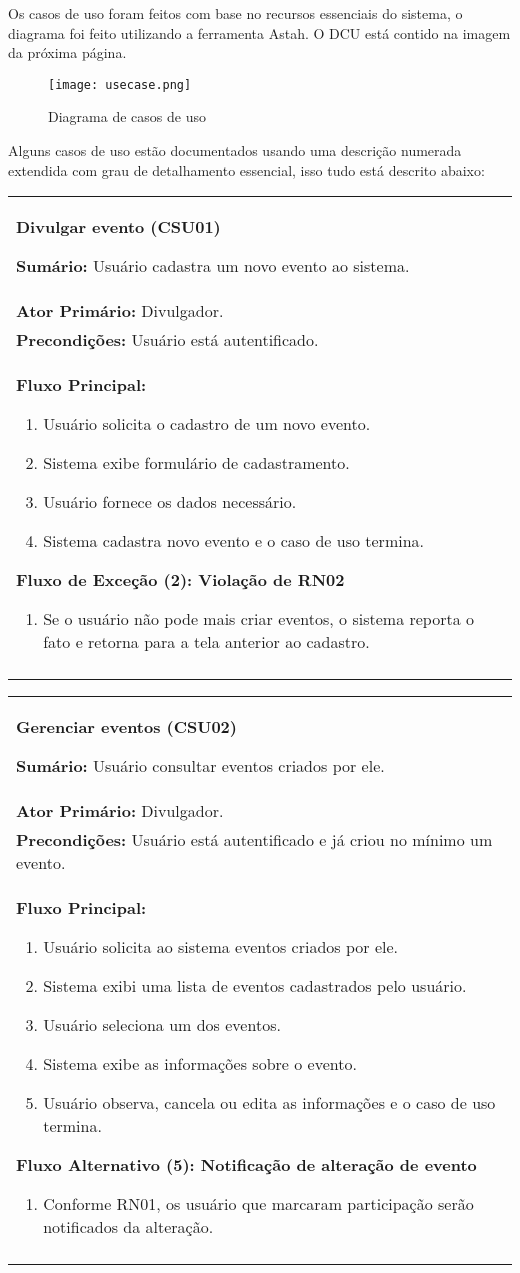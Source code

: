 \documentclass{article}
\newcommand{\sumario}[1] {\textbf{Sumário:} #1\\ }
\newcommand{\ator}[1] {\textbf{Ator Primário:} #1\\}
\newcommand{\precond}[1] {\textbf{Precondições:} #1\\}
\newcommand{\fluxo}{\textbf{Fluxo Principal:}}
\newenvironment{fluxoa}[2]
			{
			\textbf{Fluxo Alternativo (#1): #2}
			\begin{enumerate}[itemsep=0mm, label=(\alph*)]			
			}
			{
			\end{enumerate}			
			}
\newenvironment{fluxoe}[2]
			{
			\textbf{Fluxo de Exceção (#1): #2}
			\begin{enumerate}[itemsep=0mm, label=(\alph*)]			
			}
			{
			\end{enumerate}			
			}
\newenvironment{boxed}[1]
			    {
			\begin{center}
			    \begin{tabular}{|p{\textwidth}|}
			    \hline
			\begin{center}
				{\large \textbf{#1}}
			\end{center}
			    }
			    { 
			    \\\\\hline
			    \end{tabular} 
			    \end{center}
			    }
\begin{document}
			Os casos de uso foram feitos com base no recursos essenciais do sistema, o diagrama foi feito utilizando a ferramenta Astah. O DCU está contido na imagem da próxima página.
		
				\begin{figure}[H]
				\begin{center}
				\texttt{[image: usecase.png]}
				\end{center}
				\caption{Diagrama de casos de uso}
				\end{figure}
		
			Alguns casos de uso estão documentados usando uma descrição numerada extendida com grau de detalhamento essencial, isso tudo está descrito abaixo: 
		
			\begin{boxed}{Divulgar evento (CSU01)}
			\sumario{Usuário cadastra um novo evento ao sistema.}
			\ator{Divulgador.}
			\precond{Usuário está autentificado.}
			\fluxo
			\begin{enumerate}[itemsep=0mm]
			\item Usuário solicita o cadastro de um novo evento.
			\item Sistema exibe formulário de cadastramento.
			\item Usuário fornece os dados necessário.
			\item Sistema cadastra novo evento e o caso de uso termina.
			\end{enumerate}
			
			\begin{fluxoe}{2}{Violação de RN02} 
			\item Se o usuário não pode mais criar eventos, o sistema reporta o fato e retorna para a tela anterior ao cadastro.
			\end{fluxoe}
			\end{boxed}
		
			\begin{boxed}{Gerenciar eventos (CSU02)}
			\sumario{Usuário consultar eventos criados por ele.}
			\ator{Divulgador.}
			\precond{Usuário está autentificado e já criou no mínimo um evento.}
			\fluxo
			\begin{enumerate}[itemsep=0mm]
			 \item Usuário solicita ao sistema eventos criados por ele.
			 \item Sistema exibi uma lista de eventos cadastrados pelo usuário.
			 \item Usuário seleciona um dos eventos.
			 \item Sistema exibe as informações sobre o evento.
			 \item Usuário observa, cancela ou edita as informações e o caso de uso termina.\bigskip
			\end{enumerate}
			\begin{fluxoa}{5}{Notificação de alteração de evento}
			\item Conforme RN01, os usuário que marcaram participação serão notificados da alteração.
			\end{fluxoa}
			\end{boxed}
		
\end{document}
